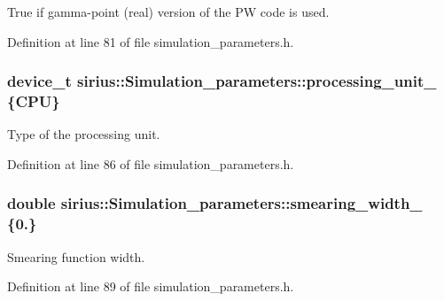 True if gamma-\/point (real) version of the P\+W code is used. 



Definition at line 81 of file simulation\+\_\+parameters.\+h.

\hypertarget{classsirius_1_1_simulation__parameters_a792a45ca1ec748a434b36754277a64b9}{}
\subsubsection[{processing\+\_\+unit\+\_\+}]{\setlength{\rightskip}{0pt plus 5cm}device\+\_\+t sirius\+::\+Simulation\+\_\+parameters\+::processing\+\_\+unit\+\_\+ \{C\+P\+U\}\hspace{0.3cm}{\ttfamily [protected]}}\label{classsirius_1_1_simulation__parameters_a792a45ca1ec748a434b36754277a64b9}


Type of the processing unit. 



Definition at line 86 of file simulation\+\_\+parameters.\+h.

\hypertarget{classsirius_1_1_simulation__parameters_aafdd05760d3a3087f077bbebf263161f}{}
\subsubsection[{smearing\+\_\+width\+\_\+}]{\setlength{\rightskip}{0pt plus 5cm}double sirius\+::\+Simulation\+\_\+parameters\+::smearing\+\_\+width\+\_\+ \{0.\}\hspace{0.3cm}{\ttfamily [protected]}}\label{classsirius_1_1_simulation__parameters_aafdd05760d3a3087f077bbebf263161f}


Smearing function width. 



Definition at line 89 of file simulation\+\_\+parameters.\+h.

\hypertarget{classsirius_1_1_simulation__parameters_ab01a2e1c36f1d9ccd0e0d5baf62e689d}{}
